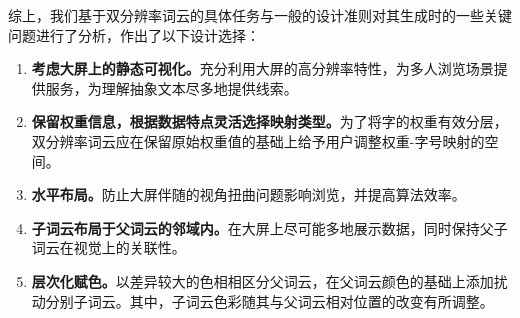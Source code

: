 \bigbreak
综上，我们基于双分辨率词云的具体任务与一般的设计准则对其生成时的一些关键问题进行了分析，作出了以下设计选择：
\begin{enumerate}[leftmargin=*]
	\renewcommand{\labelenumi}{\textbf{C\theenumi.}}
	\renewcommand{\labelenumii}{\textbf{ C\theenumi.\arabic{enumii}}}
	\item \textbf{考虑大屏上的静态可视化。}充分利用大屏的高分辨率特性，为多人浏览场景提供服务，为理解抽象文本尽多地提供线索。
	\item \textbf{保留权重信息，根据数据特点灵活选择映射类型。}为了将字的权重有效分层，双分辨率词云应在保留原始权重值的基础上给予用户调整权重-字号映射的空间。
	\item \textbf{水平布局。}防止大屏伴随的视角扭曲问题影响浏览，并提高算法效率。
	\item \textbf{子词云布局于父词云的邻域内。}在大屏上尽可能多地展示数据，同时保持父子词云在视觉上的关联性。
	\item \textbf{层次化赋色。}以差异较大的色相相区分父词云，在父词云颜色的基础上添加扰动分别子词云。其中，子词云色彩随其与父词云相对位置的改变有所调整。
\end{enumerate}
